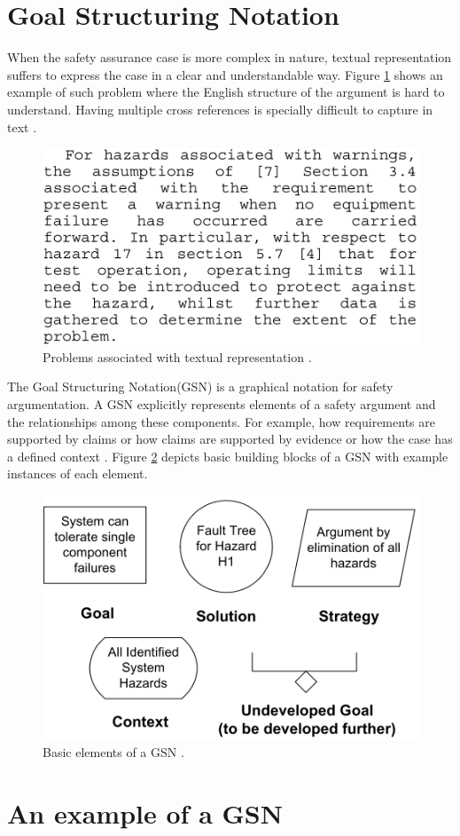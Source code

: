 \section{Goal Structuring Notation}
When the safety assurance case is more complex in nature, textual representation suffers to express the case in a clear and understandable way. Figure \ref{fig:text-case} shows an example of such problem where the English structure of the argument is hard to understand. Having multiple cross references is specially difficult to capture in text \cite{gsn2004Kelly}.
\begin{figure}
    \includegraphics[width=0.5\linewidth ]{figures/textual_case.png}
    \centering
    \caption{Problems associated with textual representation \cite{gsn2004Kelly}.}
    \label{fig:text-case}
\end{figure}

The Goal Structuring Notation(GSN) is a graphical notation for safety argumentation. A GSN explicitly represents elements of a safety argument and the relationships among these components. For example, how requirements are supported by claims or how claims are supported by evidence or how the case has a defined context \cite{gsn2004Kelly}. Figure \ref{fig:gsn} depicts basic building blocks of a GSN with example instances of each element. 

\begin{figure}
    \includegraphics[width=0.5\linewidth ]{figures/gsn.png}
    \centering
    \caption{Basic elements of a GSN \cite{gsn2004Kelly}.}
    \label{fig:gsn}
\end{figure}

\section{An example of a GSN}

